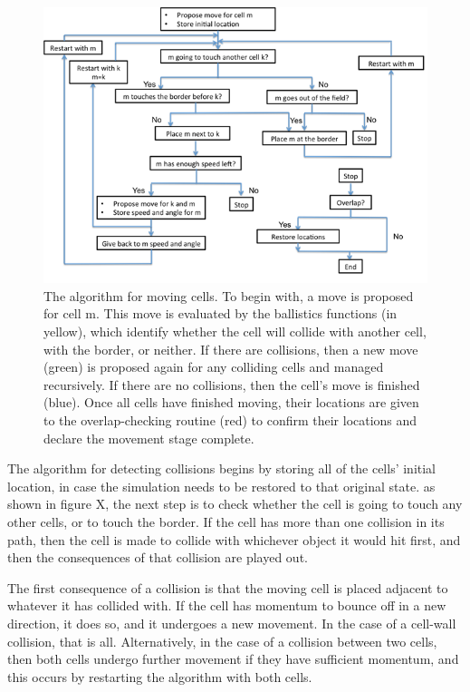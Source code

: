 \documentclass[12pt]{article}
\begin{document}
\begin{figure}[H]
\centering
\includegraphics[width=\textwidth]{media/algorithm.png}
\caption{The algorithm for moving cells. To begin with, a move is proposed
for cell m. This move is evaluated by the ballistics functions (in yellow),
which identify whether the cell will collide with another cell, with 
the border, or neither. If there are collisions, then a new move (green) is 
proposed again for any colliding cells and managed recursively. If there
are no collisions, then the cell's move is finished (blue). Once all cells
have finished moving, their locations are given to the overlap-checking routine 
(red) to confirm their locations and declare the movement stage complete.}
\end{figure}

The algorithm for detecting collisions begins by storing all of the 
cells' initial location, in case the simulation needs to be restored to 
that original state. as shown in figure X, the next step is to check 
whether the cell is going to touch any other cells, or to touch the 
border. If the cell has more than one collision in its path, then the 
cell is made to collide with whichever object it would hit first, and 
then the consequences of that collision are played out. 

The first consequence of a collision is that the moving cell is placed 
adjacent to whatever it has collided with. If the cell has momentum to 
bounce off in a new direction, it does so, and it undergoes a new 
movement. In the case of a cell-wall collision, that is all. 
Alternatively, in the case of a collision between two cells, then both 
cells undergo further movement if they have sufficient momentum, and 
this occurs by restarting the algorithm with both cells.
\end{document}
